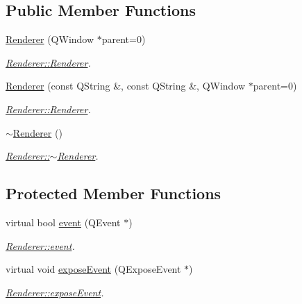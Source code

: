 \subsection*{Public Member Functions}
\begin{DoxyCompactItemize}
\item 
\hyperlink{classRenderer_a2d643cc466801828fb8ed0648ef72f4e}{Renderer} (Q\+Window $\ast$parent=0)
\begin{DoxyCompactList}\small\item\em \hyperlink{classRenderer_a2d643cc466801828fb8ed0648ef72f4e}{Renderer\+::\+Renderer}. \end{DoxyCompactList}\item 
\hyperlink{classRenderer_adbcd6b6f408774611cb936f9a781f00d}{Renderer} (const Q\+String \&, const Q\+String \&, Q\+Window $\ast$parent=0)
\begin{DoxyCompactList}\small\item\em \hyperlink{classRenderer_a2d643cc466801828fb8ed0648ef72f4e}{Renderer\+::\+Renderer}. \end{DoxyCompactList}\item 
\hyperlink{classRenderer_afeee408862d5bd6255a6882d47e6d5cd}{$\sim$\+Renderer} ()
\begin{DoxyCompactList}\small\item\em \hyperlink{classRenderer_afeee408862d5bd6255a6882d47e6d5cd}{Renderer\+::$\sim$\+Renderer}. \end{DoxyCompactList}\end{DoxyCompactItemize}
\subsection*{Protected Member Functions}
\begin{DoxyCompactItemize}
\item 
virtual bool \hyperlink{classRenderer_aa08452b84c6b687b62650322e8a05ec2}{event} (Q\+Event $\ast$)
\begin{DoxyCompactList}\small\item\em \hyperlink{classRenderer_aa08452b84c6b687b62650322e8a05ec2}{Renderer\+::event}. \end{DoxyCompactList}\item 
virtual void \hyperlink{classRenderer_a58526fa539582364b1e233d917a1d7f0}{expose\+Event} (Q\+Expose\+Event $\ast$)
\begin{DoxyCompactList}\small\item\em \hyperlink{classRenderer_a58526fa539582364b1e233d917a1d7f0}{Renderer\+::expose\+Event}. \end{DoxyCompactList}\end{DoxyCompactItemize}


